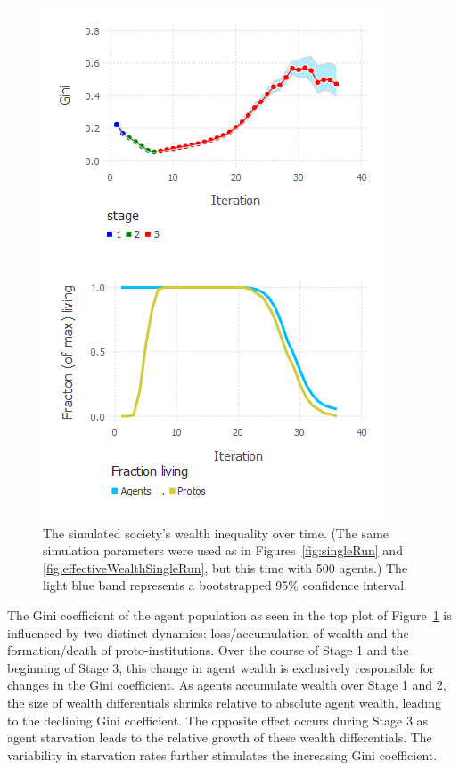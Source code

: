 
\begin{figure}[hb]
\centering
\includegraphics[width=\columnwidth]{figures/giniHistory.png}
\caption{The simulated society's wealth inequality over time. (The same
simulation parameters were used as in Figures~\ref{fig:singleRun} and
\ref{fig:effectiveWealthSingleRun}, but this time with 500 agents.) The light
blue band represents a bootstrapped 95\% confidence interval.}
\label{fig:giniHistory}
\end{figure}

    The Gini coefficient of the agent population as seen in the top plot of Figure~\ref{fig:giniHistory} is influenced by two distinct dynamics: loss/accumulation of wealth and the formation/death of proto-institutions. Over the course of Stage 1 and the beginning of Stage 3, this change in agent wealth is exclusively responsible for changes in the Gini coefficient. As agents accumulate wealth over Stage 1 and 2, the size of wealth differentials shrinks relative to absolute agent wealth, leading to the declining Gini coefficient. The opposite effect occurs during Stage 3 as agent starvation leads to the relative growth of these wealth differentials. The variability in starvation rates further stimulates the increasing Gini coefficient.

